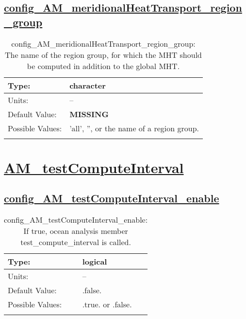 \subsection[config\_AM\_meridionalHeatTransport\_region\_group]{\hyperref[sec:nm_tab_AM_meridionalHeatTransport]{config\_AM\_meridionalHeatTransport\_region\_group}}
\label{subsec:nm_sec_config_AM_meridionalHeatTransport_region_group}
\begin{center}
\begin{longtable}{| p{2.0in} || p{4.0in} |}
    \hline
    Type: & character \\
    \hline
    Units: & -- \\
    \hline
    Default Value: & {\bf \color{red} MISSING} \\
    \hline
    Possible Values: & 'all', '', or the name of a region group. \\
    \hline
    \caption{config\_AM\_meridionalHeatTransport\_region\_group: The name of the region group, for which the MHT should be computed in addition to the global MHT.}
\end{longtable}
\end{center}
\section[AM\_testComputeInterval]{\hyperref[sec:nm_tab_AM_testComputeInterval]{AM\_testComputeInterval}}
\label{sec:nm_sec_AM_testComputeInterval}
\subsection[config\_AM\_testComputeInterval\_enable]{\hyperref[sec:nm_tab_AM_testComputeInterval]{config\_AM\_testComputeInterval\_enable}}
\label{subsec:nm_sec_config_AM_testComputeInterval_enable}
\begin{center}
\begin{longtable}{| p{2.0in} || p{4.0in} |}
    \hline
    Type: & logical \\
    \hline
    Units: & -- \\
    \hline
    Default Value: & .false. \\
    \hline
    Possible Values: & .true. or .false. \\
    \hline
    \caption{config\_AM\_testComputeInterval\_enable: If true, ocean analysis member test\_compute\_interval is called.}
\end{longtable}
\end{center}

